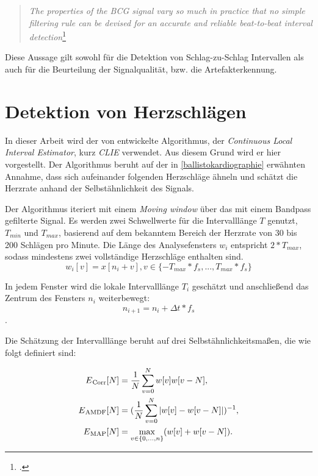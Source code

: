 	\begin{quote}\textit{The properties of the BCG signal vary so much in practice that no simple filtering rule can be devised for an accurate and reliable beat-to-beat interval detection}\footcite{Paalasmaa2015}\end{quote}
	
	Diese Aussage gilt sowohl für die Detektion von Schlag-zu-Schlag Intervallen als auch für die Beurteilung der Signalqualität, bzw. die Artefakterkennung.

\section{Detektion von Herzschlägen}\label{CLIE}

	In dieser Arbeit wird der von \citeauthor{Bruser2013} entwickelte Algorithmus, der \textit{Continuous Local Interval Estimator}, kurz \textit{CLIE} verwendet. Aus diesem Grund wird er hier vorgestellt. Der Algorithmus beruht auf der in \ref{ballistokardiographie} erwähnten Annahme, dass sich aufeinander folgenden Herzschläge ähneln und schätzt die Herzrate anhand der Selbstähnlichkeit des Signals.


	Der Algorithmus iteriert mit einem \textit{Moving window} über das mit einem Bandpass gefilterte Signal. Es werden zwei Schwellwerte für die Intervalllänge $T$ genutzt, $T_{min}$ und $T_{max}$, basierend auf dem bekanntem Bereich der Herzrate von 30 bis 200 Schlägen pro Minute. Die Länge des Analysefensters $w_i$ entspricht $2 * T_{max}$, sodass mindestens zwei vollständige Herzschläge enthalten sind.
	\[w_i[v] = x[n_i + v], v \in \{ -T_{max} * f_s, ..., T_{max} * f_s\}\]
	
	In jedem Fenster wird die lokale Intervalllänge $T_i$ geschätzt und anschließend das Zentrum des Fensters $n_i$ weiterbewegt: \[ n_{i+1} = n_i + \Delta t * f_s \].
	
	Die Schätzung der Intervalllänge beruht auf drei Selbstähnlichkeitsmaßen, die wie folgt definiert sind:
	
	\begin{align*}
		E\textsubscript{Corr}[N] &= \frac{1}{N} \sum_{v=0}^{N} w[v]w[v-N],\\
		E\textsubscript{AMDF}[N] &= (\frac{1}{N} \sum_{v=0}^{N} |w[v]-w[v-N]|)^{-1},\\
		E\textsubscript{MAP}[N] &= \max_{v \in \{0,...,n\}}(w[v]+w[v-N]).
	\end{align*}
 	
